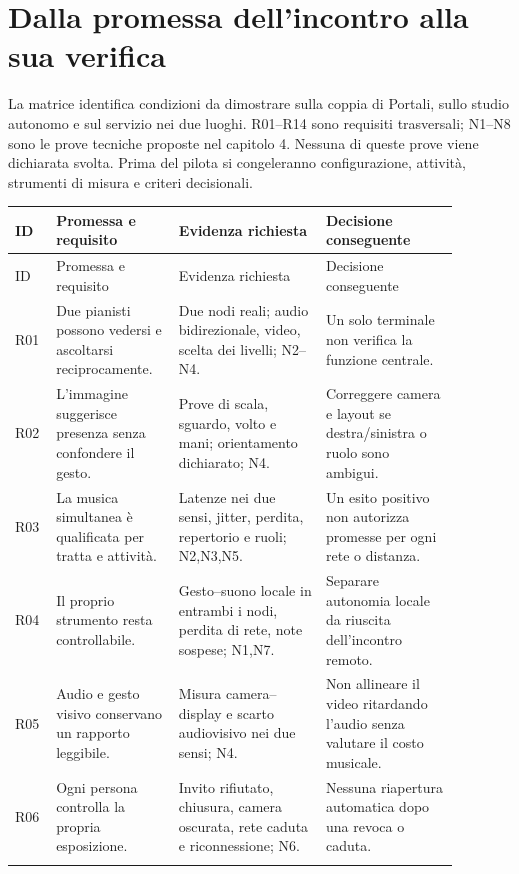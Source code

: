 \chapter{Dalla promessa dell'incontro alla sua verifica}\label{app:requirements}

La matrice identifica condizioni da dimostrare sulla coppia di Portali, sullo studio autonomo e sul servizio nei due luoghi. R01--R14 sono requisiti trasversali; N1--N8 sono le prove tecniche proposte nel capitolo 4. Nessuna di queste prove viene dichiarata svolta. Prima del pilota si congeleranno configurazione, attività, strumenti di misura e criteri decisionali.

\small
\begin{longtable}{P{0.06\linewidth}P{0.25\linewidth}P{0.30\linewidth}P{0.27\linewidth}}
\toprule ID & Promessa e requisito & Evidenza richiesta & Decisione conseguente \\\midrule
\endfirsthead
\toprule ID & Promessa e requisito & Evidenza richiesta & Decisione conseguente \\\midrule
\endhead
R01 & Due pianisti possono vedersi e ascoltarsi reciprocamente. & Due nodi reali; audio bidirezionale, video, scelta dei livelli; N2--N4. & Un solo terminale non verifica la funzione centrale. \\\addlinespace
R02 & L'immagine suggerisce presenza senza confondere il gesto. & Prove di scala, sguardo, volto e mani; orientamento dichiarato; N4. & Correggere camera e layout se destra/sinistra o ruolo sono ambigui. \\\addlinespace
R03 & La musica simultanea è qualificata per tratta e attività. & Latenze nei due sensi, jitter, perdita, repertorio e ruoli; N2,N3,N5. & Un esito positivo non autorizza promesse per ogni rete o distanza. \\\addlinespace
R04 & Il proprio strumento resta controllabile. & Gesto--suono locale in entrambi i nodi, perdita di rete, note sospese; N1,N7. & Separare autonomia locale da riuscita dell'incontro remoto. \\\addlinespace
R05 & Audio e gesto visivo conservano un rapporto leggibile. & Misura camera--display e scarto audiovisivo nei due sensi; N4. & Non allineare il video ritardando l'audio senza valutare il costo musicale. \\\addlinespace
R06 & Ogni persona controlla la propria esposizione. & Invito rifiutato, chiusura, camera oscurata, rete caduta e riconnessione; N6. & Nessuna riapertura automatica dopo una revoca o caduta. \\\addlinespace

\end{longtable}
